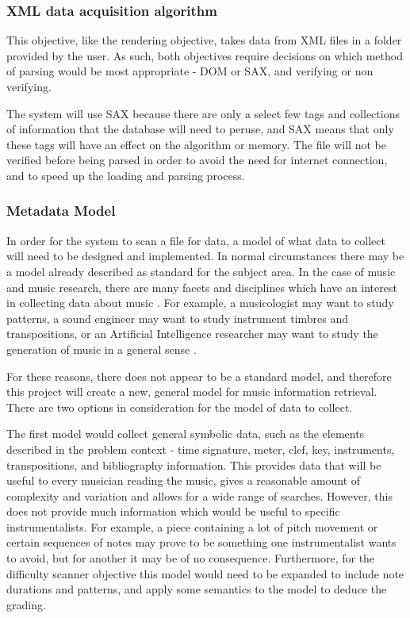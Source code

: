 \subsubsection{XML data acquisition algorithm}
This objective, like the rendering objective, takes data from XML files in a folder provided by the user. As such, both objectives require decisions on which method of parsing would be most appropriate - DOM or SAX, and verifying or non verifying.

The system will use SAX because there are only a select few tags and collections of information that the database will need to peruse, and SAX means that only these tags will have an effect on the algorithm or memory.
The file will not be verified before being parsed in order to avoid the need for internet connection, and to speed up the loading and parsing process.

\subsubsection{Metadata Model}
In order for the system to scan a file for data, a model of what data to collect will need to be designed and implemented. In normal circumstances there may be a model already described as standard for the subject area. In the case of music and music research, there are many facets and disciplines which have an interest in collecting data about music \parencite{MIR}. For example, a musicologist may want to study patterns, a sound engineer may want to study instrument timbres and transpositions, or an Artificial Intelligence researcher may want to study the generation of music in a general sense \parencite{creativeMachines}. 

For these reasons, there does not appear to be a standard model, and therefore this project will create a new, general model for music information retrieval.
There are two options in consideration for the model of data to collect.

The first model would collect general symbolic data, such as the elements described in the problem context - time signature, meter, clef, key, instruments, transpositions, and bibliography information. This provides data that will be useful to every musician reading the music, gives a reasonable amount of complexity and variation and allows for a wide range of searches.
However, this does not provide much information which would be useful to specific instrumentalists. For example, a piece containing a lot of pitch movement or certain sequences of notes may prove to be something one instrumentalist wants to avoid, but for another it may be of no consequence.
Furthermore, for the difficulty scanner objective this model would need to be expanded to include note durations and patterns, and apply some semantics to the model to deduce the grading.

